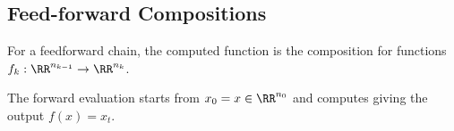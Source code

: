      
   
                                 

                                                                                                                   
              
                    
                                    
                     
                          
                                    
                              
                                                
                                                    
                             
                                                           
                                              
                                                       
                                                           
                                                        
                                                         
                                                        
                                                                
                                                            
                                                        
                                              
                                               
            
   


                                                                        
\subsection{Feed-forward Compositions}\label{sec-reversemode-simple}

For a feedforward chain, the computed function is the composition
for functions $f_k : \RR^{n_{k-1}} \rightarrow \RR^{n_{k}}$.

The forward evaluation starts from $x_0=x \in \RR^{n_0}$ and computes
giving the output $f(x) = x_t$.

